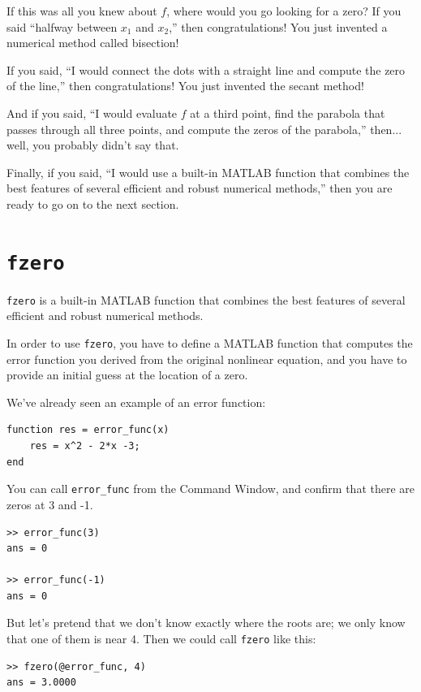 \documentclass[
]{book}
\begin{document}
If this was all you knew about $f$, where would you go looking for
a zero?  If you said ``halfway between $x_1$ and $x_2$,'' then
congratulations!  You just invented a numerical method called
bisection!

If you said, ``I would connect the dots with a straight line
and compute the zero of the line,'' then
congratulations!  You just invented the secant method!

And if you said, ``I would evaluate $f$ at a third point, find the
parabola that passes through all three points, and compute the zeros
of the parabola,'' then... well, you probably didn't say that.

Finally, if you said, ``I would use a built-in MATLAB function that
combines the best features of several efficient and robust
numerical methods,'' then you are ready to go on to the next section.


\section{{\tt fzero}}
\label{sect:fzero}

{\tt fzero} is a built-in MATLAB function that
combines the best features of several efficient and robust
numerical methods.

In order to use {\tt fzero}, you have to define a MATLAB function
that computes the error function you derived from the original
nonlinear equation, and you have to provide an initial guess at
the location of a zero.

We've already seen an example of an error function:

\begin{verbatim}
function res = error_func(x)
    res = x^2 - 2*x -3;
end
\end{verbatim}

You can call {\tt error\_func} from the Command Window, and
confirm that there are zeros at 3 and -1.

\begin{verbatim}
>> error_func(3)
ans = 0

>> error_func(-1)
ans = 0
\end{verbatim}

But let's pretend that we don't know exactly where
the roots are; we only know that one of them is near 4.  Then
we could call {\tt fzero} like this:

\begin{verbatim}
>> fzero(@error_func, 4)
ans = 3.0000
\end{verbatim}
\end{document}
